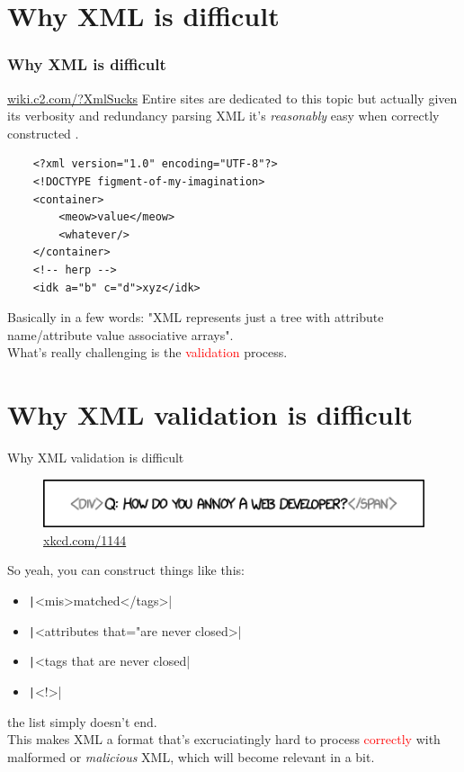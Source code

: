 \documentclass{beamer}
\begin{document}
\section{Why XML is difficult}
\begin{frame}[fragile]\frametitle{Why XML is difficult}
    \begin{block}{\href{https://wiki.c2.com/?XmlSucks}{wiki.c2.com/?XmlSucks}}
        Entire sites are dedicated to this topic but actually given its verbosity and redundancy parsing XML it's \emph{reasonably} easy when correctly constructed .\\
    \begin{verbatim}
    <?xml version="1.0" encoding="UTF-8"?>
    <!DOCTYPE figment-of-my-imagination>
    <container>
        <meow>value</meow>
        <whatever/>
    </container>
    <!-- herp -->
    <idk a="b" c="d">xyz</idk>
        \end{verbatim}
        Basically in a few words: "XML represents just a tree with attribute name/attribute value associative arrays".\\\vspace{2mm}
        What's really challenging is the \textcolor{red}{validation} process. 
    \end{block}
\end{frame}

\section{Why XML validation is difficult}
\begin{frame}[fragile]{Why XML validation is difficult}
    \begin{figure}
        \includegraphics[scale=0.75]{tags.png}
        \\{\footnotesize\href{https://xkcd.com/1144/}{xkcd.com/1144}}
    \end{figure}
    \begin{flushleft}
    So yeah, you can construct things like this:
    \begin{itemize}
        \item\texttt|<mis>matched</tags>|
        \item\texttt|<attributes that="are never closed>|
        \item\texttt|<tags that are never closed|
        \item\texttt|<!>|
    \end{itemize}
    the list simply doesn’t end.\vspace{5mm}\\
    This makes XML a format that’s excruciatingly hard to process \textcolor{red}{correctly} with malformed or \emph{malicious} XML, which will become relevant in a bit.
    \end{flushleft}
\end{frame}
\end{document}
